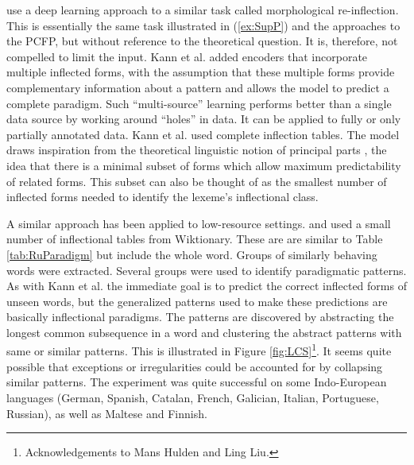 \documentclass[12pt]{article}
\begin{document}
 use a deep learning approach to a similar task called morphological re-inflection. This is essentially the same task illustrated in (\ref{ex:SupP}) and the approaches to the PCFP, but without reference to the theoretical question. It is, therefore, not compelled to limit the input. Kann et al. added encoders that incorporate multiple inflected forms, with the assumption that these multiple forms provide complementary information about a pattern and allows the model to predict a complete paradigm. Such ``multi-source'' learning performs better than a single data source by working around ``holes” in data. It can be applied to fully or only partially annotated data. Kann et al. used complete inflection tables. 
The model draws inspiration from the theoretical linguistic notion of principal parts \cite{blevins2006word,finkel_principal_2007}, the idea that there is a minimal subset of forms which allow maximum predictability of related forms. This subset can also be thought of as the smallest number of inflected forms needed to identify the lexeme's inflectional class. 

A similar approach has been applied to low-resource settings.  and  used a small number of inflectional tables from Wiktionary. These are are similar to Table \ref{tab:RuParadigm} but include the whole word. Groups of similarly behaving words were extracted. Several groups were used to identify paradigmatic patterns. As with Kann et al. the immediate goal is to predict the correct inflected forms of unseen words, but the generalized patterns used to make these predictions are basically inflectional paradigms. The patterns are discovered by abstracting the longest common subsequence in a word and clustering the abstract patterns with same or similar patterns. This is illustrated in Figure \ref{fig:LCS}\footnote{Acknowledgements to Mans Hulden and Ling Liu.}. It seems quite possible that exceptions or irregularities could be accounted for by collapsing similar patterns. The experiment was quite successful on some Indo-European languages (German, Spanish, Catalan, French, Galician, Italian, Portuguese, Russian), as well as Maltese and Finnish.
\end{document}
